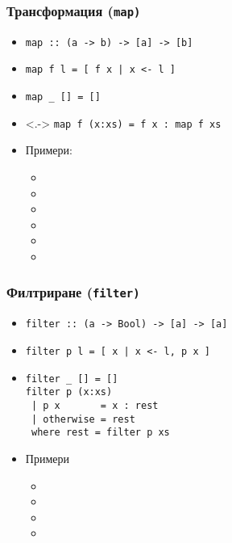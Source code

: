 \documentclass{beamer}
\begin{document}
\begin{frame}
  \frametitle{Трансформация (\tt{map})}
  \begin{itemize}[<+->]
  \item \tt{map :: (a -> b) -> [a] -> [b]}
  \item \tt{map f l = [ f x  | x <- l ]}
  \item \tt{map \_ [] = []}
  \item<.-> \tt{map f (x:xs) = f x : map f xs}
  \item Примери:
    \begin{itemize}
    \item {}
    \item {}
    \item {}
    \item {}
    \item {}
    \item 
    \end{itemize}
  \end{itemize}
\end{frame}

\begin{frame}[fragile]
  \frametitle{Филтриране (\tt{filter})}
  \begin{itemize}[<+->]
  \item \tt{filter :: (a -> Bool) -> [a] -> [a]}
  \item \tt{filter p l = [ x | x <- l, p x ]}
  \item
\begin{verbatim}
filter _ [] = []
filter p (x:xs)
 | p x       = x : rest
 | otherwise = rest
 where rest = filter p xs
\end{verbatim}
  \item Примери
    \begin{itemize}
    \item {}
    \item {}
    \item {}
    \item {}
    \end{itemize}
  \end{itemize}
\end{frame}
\end{document}
